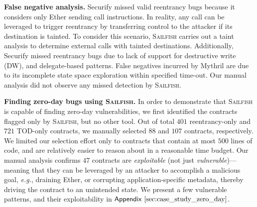 \documentclass[conference, romanappendices]{tex/IEEEtran}
\theoremstyle{bfnote}
\newcommand{\toolname}{\textsc{Sailfish}\xspace}
\newcommand{\securify}{{\sc Securify}\xspace}
\newcommand{\ether}{{Ether}\xspace}
\newcommand{\reentrancy}{{reentrancy}\xspace}
\newcommand{\mythril}{{\sc Mythril}\xspace}
\newcommand{\eg}{\textit{e.g.}}
\newcommand{\Appen}[1]{\ensuremath{\sf Appendix~\ref{#1}}}
\newcommand{\clintOnlyDAO}{401}
\newcommand{\clintOnlyDAOTriage}{88}
\newcommand{\clintOnlyTOD}{721}
\newcommand{\clintOnlyTODTriage}{107}
\newcommand{\zeroDays}{47}
\begin{document}
\noindent
\textbf{False negative analysis.}
\securify{} missed valid \reentrancy bugs because it considers only \ether sending call instructions.
In reality, any call can be leveraged to trigger \reentrancy by transferring control to the attacker if its destination is tainted.
To consider this scenario, \toolname{} carries out a taint analysis to determine external calls with tainted destinations.
Additionally, \securify missed \reentrancy bugs due to lack of support for destructive write (DW), and delegate-based patterns.
False negatives incurred by \mythril{} are due to its incomplete state space exploration within specified time-out.
Our manual analysis did not observe any missed detection by \toolname.

\noindent
\textbf{Finding zero-day bugs using \toolname.}
In order to demonstrate that \toolname is capable of finding zero-day vulnerabilities, we first identified the contracts flagged only by \toolname, but no other tool.
Out of total $\clintOnlyDAO$ \reentrancy-only and $\clintOnlyTOD$ TOD-only contracts, we manually selected $\clintOnlyDAOTriage$ and $\clintOnlyTODTriage$ contracts, respectively.
We limited our selection effort only to contracts that contain at most $500$ lines of code, and are relatively easier to reason about in a reasonable time budget.
Our manual analysis confirms $\zeroDays$ contracts are \textit{exploitable} (not just \textit{vulnerable})---meaning that they can be leveraged by an attacker to accomplish a malicious goal, \eg, {draining\EndAccSupp{}} \ether, or corrupting application-specific metadata, thereby driving the contract to an unintended state.
We present a few vulnerable patterns, and their exploitability in \Appen{sec:case_study_zero_day}.
\end{document}
